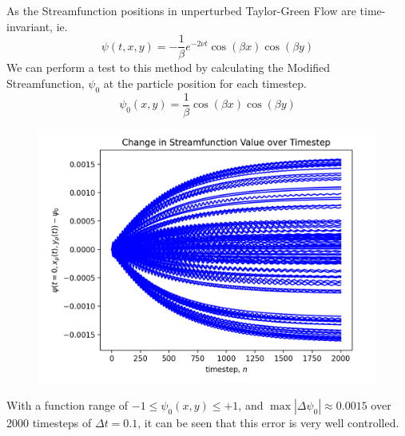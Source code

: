 \documentclass[10pt, reqno]{amsart}
\begin{document}
\begin{multicols}{2}
As the Streamfunction positions in unperturbed Taylor-Green Flow are time-invariant, ie.
\begin{equation}
    \psi(t, x, y) = - \frac{1}{\beta} e^{-2 \nu t} \cos(\beta x) \cos(\beta y)
\end{equation}
We can perform a test to this method by calculating the Modified Streamfunction, $\psi_0$ at the particle position for each timestep. 
\begin{equation}
    \psi_0(x, y) = \frac{1}{\beta} \cos(\beta x) \cos(\beta y)
\end{equation}
\begin{figure}[H]
    \centering
    \includegraphics[width = 1\linewidth]{Predictor-Corrector TG 100 Trajectories.png}
\end{figure}
With a function range of $ -1 \leq \psi_0(x, y) \leq +1$, and  $\max |\Delta \psi_0| \approx 0.0015$ over 2000 timesteps of $\Delta t = 0.1$, it can be seen that this error is very well controlled.


\end{multicols}
\end{document}
